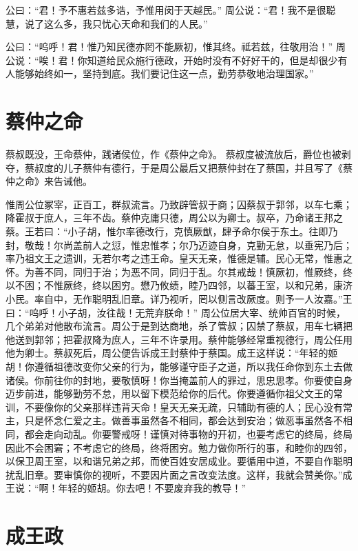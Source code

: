 \documentclass[a4paper,12pt,UTF8,twoside]{ctexbook}
\begin{document}
公曰：“君！予不惠若兹多诰，予惟用闵于天越民。”
周公说：“君！我不是很聪慧，说了这么多，我只忧心天命和我们的人民。”

公曰：“呜呼！君！惟乃知民德亦罔不能厥初，惟其终。祗若兹，往敬用治！”
周公说：“唉！君！你知道给民众施行德政，开始时没有不好好干的，但是却很少有人能够始终如一，坚持到底。我们要记住这一点，勤劳恭敬地治理国家。”

\chapter{蔡仲之命}

蔡叔既没，王命蔡仲，践诸侯位，作《蔡仲之命》。
蔡叔度被流放后，爵位也被剥夺，蔡叔度的儿子蔡仲有德行，于是周公最后又把蔡仲封在了蔡国，并且写了《蔡仲之命》来告诫他。

惟周公位冢宰，正百工，群叔流言。乃致辟管叔于商；囚蔡叔于郭邻，以车七乘；降霍叔于庶人，三年不齿。蔡仲克庸只德，周公以为卿士。叔卒，乃命诸王邦之蔡。王若曰：“小子胡，惟尔率德改行，克慎厥猷，肆予命尔侯于东土。往即乃封，敬哉！尔尚盖前人之愆，惟忠惟孝；尔乃迈迹自身，克勤无怠，以垂宪乃后；率乃祖文王之遗训，无若尔考之违王命。皇天无亲，惟德是辅。民心无常，惟惠之怀。为善不同，同归于治；为恶不同，同归于乱。尔其戒哉！慎厥初，惟厥终，终以不困；不惟厥终，终以困穷。懋乃攸绩，睦乃四邻，以蕃王室，以和兄弟，康济小民。率自中，无作聪明乱旧章。详乃视听，罔以侧言改厥度。则予一人汝嘉。”王曰：“呜呼！小子胡，汝往哉！无荒弃朕命！”
周公位居大宰、统帅百官的时候，几个弟弟对他散布流言。周公于是到达商地，杀了管叔；囚禁了蔡叔，用车七辆把他送到郭邻；把霍叔降为庶人，三年不许录用。蔡仲能够经常重视德行，周公任用他为卿士。蔡叔死后，周公便告诉成王封蔡仲于蔡国。成王这样说：“年轻的姬胡！你遵循祖德改变你父亲的行为，能够谨守臣子之道，所以我任命你到东土去做诸侯。你前往你的封地，要敬慎呀！你当掩盖前人的罪过，思忠思孝。你要使自身迈步前进，能够勤劳不怠，用以留下模范给你的后代。你要遵循你祖父文王的常训，不要像你的父亲那样违背天命！皇天无亲无疏，只辅助有德的人；民心没有常主，只是怀念仁爱之主。做善事虽然各不相同，都会达到安治；做恶事虽然各不相同，都会走向动乱。你要警戒呀！谨慎对待事物的开初，也要考虑它的终局，终局因此不会困窘；不考虑它的终局，终将困穷。勉力做你所行的事，和睦你的四邻，以保卫周王室，以和谐兄弟之邦，而使百姓安居成业。要循用中道，不要自作聪明扰乱旧章。要审慎你的视听，不要因片面之言改变法度。这样，我就会赞美你。”成王说：“啊！年轻的姬胡。你去吧！不要废弃我的教导！”

\chapter{成王政}
\end{document}
